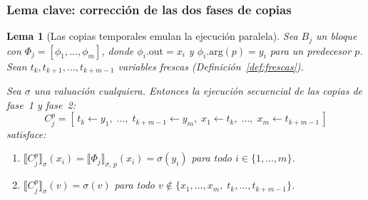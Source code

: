 \documentclass[12pt, a4paper]{article}
\newtheorem{lemma}{Lema}[section]
\begin{document}
\subsubsection{Lema clave: corrección de las dos fases de copias}

%
%

\begin{lemma}[Las copias temporales emulan la ejecución paralela]
\label{lem:two-phase}
Sea $B_j$ un bloque con $\Phi_j = [\phi_1, \ldots, \phi_m]$, donde
$\phi_i.\mathrm{out} = x_i$ y $\phi_i.\mathrm{arg}(p) = y_i$ para un predecesor $p$.
Sean $t_k, t_{k+1}, \ldots, t_{k+m-1}$ variables frescas (Definición~\ref{def:frescas}).

Sea $\sigma$ una valuación cualquiera. Entonces la ejecución secuencial de las copias de
fase~1 y fase~2:
\[
  C_j^p = [\,t_k \leftarrow y_1,\; \ldots,\; t_{k+m-1} \leftarrow y_m,\;
            x_1 \leftarrow t_k,\; \ldots,\; x_m \leftarrow t_{k+m-1}\,]
\]
satisface:
\begin{enumerate}
  \item $\llbracket C_j^p \rrbracket_\sigma(x_i)
        = \llbracket \Phi_j \rrbracket_{\sigma,\,p}(x_i)
        = \sigma(y_i)$
    \quad para todo $i \in \{1, \ldots, m\}$.

  \item $\llbracket C_j^p \rrbracket_\sigma(v) = \sigma(v)$
    \quad para todo $v \notin \{x_1, \ldots, x_m,\; t_k, \ldots, t_{k+m-1}\}$.
\end{enumerate}
\end{lemma}
\end{document}
